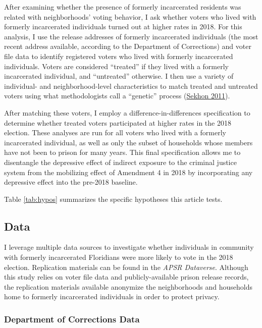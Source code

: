 \documentclass[
  12pt,
]{article}
\begin{document}
After examining whether the presence of formerly incarcerated residents was related with neighborhoods' voting behavior, I ask whether voters who lived with formerly incarcerated individuals turned out at higher rates in 2018. For this analysis, I use the release addresses of formerly incarcerated individuals (the most recent address available, according to the Department of Corrections) and voter file data to identify registered voters who lived with formerly incarcerated individuals. Voters are considered ``treated'' if they lived with a formerly incarcerated individual, and ``untreated'' otherwise. I then use a variety of individual- and neighborhood-level characteristics to match treated and untreated voters using what methodologists call a ``genetic'' process (\protect\hyperlink{ref-Sekhon2011}{Sekhon 2011}).

After matching these voters, I employ a difference-in-differences specification to determine whether treated voters participated at higher rates in the 2018 election. These analyses are run for all voters who lived with a formerly incarcerated individual, as well as only the subset of households whose members have not been to prison for many years. This final specification allows me to disentangle the depressive effect of indirect exposure to the criminal justice system from the mobilizing effect of Amendment 4 in 2018 by incorporating any depressive effect into the pre-2018 baseline.

Table \ref{tab:hypos} summarizes the specific hypotheses this article tests.



\hypertarget{data}{%
\subsection*{Data}\label{data}}

I leverage multiple data sources to investigate whether individuals in community with formerly incarcerated Floridians were more likely to vote in the 2018 election. Replication materials can be found in the \emph{APSR Dataverse}. Although this study relies on voter file data and publicly-available prison release records, the replication materials available anonymize the neighborhoods and households home to formerly incarcerated individuals in order to protect privacy.

\hypertarget{department-of-corrections-data}{%
\subsubsection*{Department of Corrections Data}\label{department-of-corrections-data}}
\end{document}
